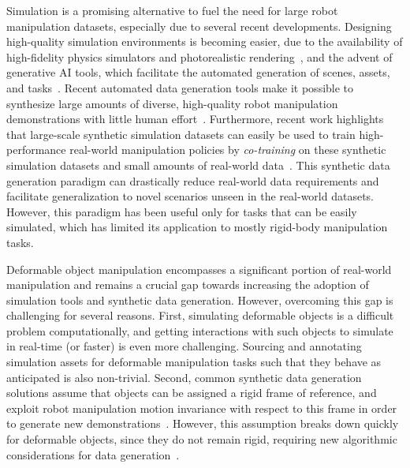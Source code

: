 \documentclass[letterpaper, 10 pt, conference]{ieeeconf}  %
\begin{document}
Simulation is a promising alternative to fuel the need for large robot manipulation datasets, especially due to several recent developments. Designing high-quality simulation environments is becoming easier, due to the availability of high-fidelity physics simulators and photorealistic rendering~\cite{todorov2012mujoco, mittal2025isaac}, and the advent of generative AI tools, which facilitate the automated generation of scenes, assets, and tasks~\cite{wang2023robogen, robocasa2024}. Recent automated data generation tools make it possible to synthesize large amounts of diverse, high-quality robot manipulation demonstrations with little human effort~\cite{dalal2023imitating, mandlekar2023mimicgen, jiang2024dexmimicgen, garrett2024skillmimicgen}. Furthermore, recent work highlights that large-scale synthetic simulation datasets can easily be used to train high-performance real-world manipulation policies by \textit{co-training} on these synthetic simulation datasets and small amounts of real-world data~\cite{maddukuri2025sim, wei2025empirical, bjorck2025gr00t}. This synthetic data generation paradigm can drastically reduce real-world data requirements and facilitate generalization to novel scenarios unseen in the real-world datasets. However, this paradigm has been useful only for tasks that can be easily simulated, which has limited its application to mostly rigid-body manipulation tasks.


Deformable object manipulation encompasses a significant portion of real-world manipulation and remains a crucial gap towards increasing the adoption of simulation tools and synthetic data generation. However, overcoming this gap is challenging for several reasons. First, simulating deformable objects is a difficult problem computationally, and getting interactions with such objects to simulate in real-time (or faster) is even more challenging. Sourcing and annotating simulation assets for deformable manipulation tasks such that they behave as anticipated is also non-trivial. Second, common synthetic data generation solutions assume that objects can be assigned a rigid frame of reference, and exploit robot manipulation motion invariance with respect to this frame in order to generate new demonstrations~\cite{mandlekar2023mimicgen, jiang2024dexmimicgen, garrett2024skillmimicgen}. However, this assumption breaks down quickly for deformable objects, since they do not remain rigid, requiring new algorithmic considerations for data generation~\cite{schulman2016learning, schulman2013case, lee2014unifying}.
\end{document}
